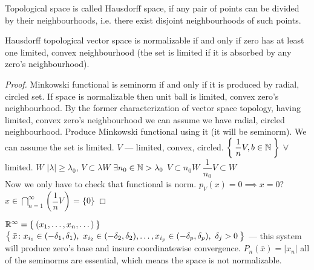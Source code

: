 \begin{defn}
  Topological space is called Hausdorff space, if any pair of points can be
  divided by their neighbourhoods, i.e. there exist disjoint neighbourhoods of such points.
\end{defn}

\begin{thm}[Kolmogorov]
  Hausdorff topological vector space is normalizable if and only if zero has at least one 
  limited, convex neighbourhood (the set is limited if it is absorbed by any zero's neighbourhood).
\end{thm}

\begin{proof}
  Minkowski functional is seminorm if and only if it is produced by radial,
  circled set. If space is normalizable then unit ball is limited, convex zero's
  neighbourhood.
  By the former characterization of vector space topology, having limited, convex zero's
  neighbourhood we can assume we have radial, circled neighbourhood. Produce Minkowski
  functional using it (it will be seminorm). We can assume the set is limited.
  $V$ --- limited, convex, circled. $\Set{\dfrac{1}{n}V, b \in \mathbb{N}}$
  $\forall$ limited.
  $W$ $|\lambda| \geq \lambda_0$, $V \subset \lambda W$
  $\exists n_0 \in \mathbb{N} > \lambda_0$
  $V \subset n_0 W$ $\dfrac{1}{n_0} V \subset W$ \\
  Now we only have to check that functional is norm.
  $p_V(x) = 0 \implies x = 0?$ \\
  $x \in \bigcap\limits_{n = 1}^\infty \left(\dfrac{1}{n} V\right) = \{0\}$
\end{proof}

\begin{ex}
  $\mathbb{R}^\infty = \Set{(x_1, \dotsc, x_n, \dotsc)}$ \\
  $\Set{\bar{x} \colon x_{i_1} \in (-\delta_1, \delta_1),\ x_{i_2} \in
    (-\delta_2, \delta_2), \dotsc, x_{i_p} \in (-\delta_p, \delta_p),\ \delta_j
    > 0}$ --- this system will produce zero's base and insure coordinatewise
  convergence. $P_n(\bar{x}) = |x_n|$ all of the seminorms are essential, which
  means the space is not normalizable.
\end{ex}
